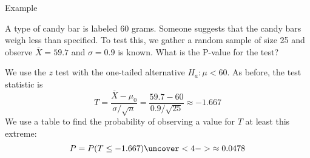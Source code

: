 \documentclass[t,handout]{beamer}
\begin{document}
        \begin{frame}{Example}
        \begin{block}{}
        A type of candy bar is labeled 60 grams. Someone suggests that the candy bars weigh less than specified. To test this, we gather a random sample of size 25 and observe $\overline X=59.7$ and $\sigma=0.9$ is known. What is the P-value for the test?
        \end{block}
        
        \pause We use the $z$ test with the one-tailed alternative $H_a: \mu<60$. As before, the test statistic  is
        $$T=\frac{\overline X-\mu_0}{\sigma/\sqrt{n}}=\frac{59.7-60}{0.9/\sqrt{25}}\approx -1.667$$
        \pause We use a table to find the probability of observing a value for $T$ at least this extreme:
        $$P=P(T\leq -1.667)
        \uncover<4->{ \approx 0.0478 }$$
        \end{frame}
\end{document}
